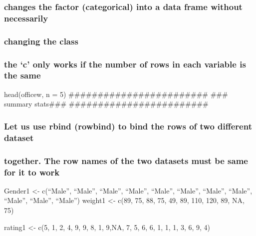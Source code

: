 \documentclass[
]{article}
\begin{document}
\hypertarget{changes-the-factor-categorical-into-a-data-frame-without-necessarily}{%
\subsubsection{changes the factor (categorical) into a data frame
without
necessarily}\label{changes-the-factor-categorical-into-a-data-frame-without-necessarily}}

\hypertarget{changing-the-class}{%
\subsubsection{changing the class}\label{changing-the-class}}

\hypertarget{the-c-only-works-if-the-number-of-rows-in-each-variable-is-the-same}{%
\subsubsection{the `c' only works if the number of rows in each variable
is the
same}\label{the-c-only-works-if-the-number-of-rows-in-each-variable-is-the-same}}

head(officew, n = 5) \#\#\#\#\#\#\#\#\#\#\#\#\#\#\#\#\#\#\#\#\#\#\#\#
\#\#\# summary stats\#\#\#
\#\#\#\#\#\#\#\#\#\#\#\#\#\#\#\#\#\#\#\#\#\#\#\#

\hypertarget{let-us-use-rbind-rowbind-to-bind-the-rows-of-two-different-dataset}{%
\subsubsection{Let us use rbind (rowbind) to bind the rows of two
different
dataset}\label{let-us-use-rbind-rowbind-to-bind-the-rows-of-two-different-dataset}}

\hypertarget{together.-the-row-names-of-the-two-datasets-must-be-same-for-it-to-work}{%
\subsubsection{together. The row names of the two datasets must be same
for it to
work}\label{together.-the-row-names-of-the-two-datasets-must-be-same-for-it-to-work}}

Gender1 \textless- c(``Male'', ``Male'', ``Male'', ``Male'', ``Male'',
``Male'', ``Male'', ``Male'', ``Male'', ``Male'', ``Male'') weight1
\textless- c(89, 75, 88, 75, 49, 89, 110, 120, 89, NA, 75)

rating1 \textless- c(5, 1, 2, 4, 9, 9, 8, 1, 9,NA, 7, 5, 6, 6, 1, 1, 1,
3, 6, 9, 4)
\end{document}
